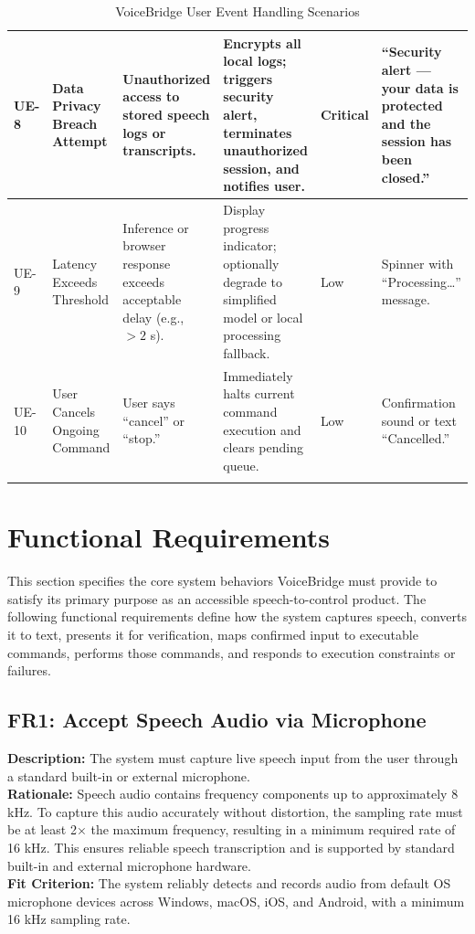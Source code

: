 \documentclass[11pt]{article}
\begin{document}
\begin{table}[H]
\begin{tabularx}{\textwidth}{p{1cm} p{2cm} X X p{1cm} p{2cm}}
\hline
UE-8 & Data Privacy Breach Attempt & Unauthorized access to stored speech logs or transcripts. & Encrypts all local logs; triggers security alert, terminates unauthorized session, and notifies user. & Critical & “Security alert — your data is protected and the session has been closed.” \\
\hline
UE-9 & Latency Exceeds Threshold & Inference or browser response exceeds acceptable delay (e.g., $> 2$ s). & Display progress indicator; optionally degrade to simplified model or local processing fallback. & Low & Spinner with “Processing…” message. \\
\hline
UE-10 & User Cancels Ongoing Command & User says “cancel” or “stop.” & Immediately halts current command execution and clears pending queue. & Low & Confirmation sound or text “Cancelled.” \\
\bottomrule
\caption{VoiceBridge User Event Handling Scenarios}
\label{tab:undesired-events}
\end{tabularx}
\end{table}



\section{Functional Requirements}\label{sec:FR}
This section specifies the core system behaviors VoiceBridge must provide to satisfy its primary purpose as an accessible speech-to-control product. The following functional requirements define how the system captures speech, converts it to text, presents it for verification, maps confirmed input to executable commands, performs those commands, and responds to execution constraints or failures.

\subsection{FR1: Accept Speech Audio via Microphone}\label{fr:FR1}
\textbf{Description:} The system must capture live speech input from the user through a standard built-in or external microphone.\\
\textbf{Rationale:} Speech audio contains frequency components up to approximately 8 kHz. To capture this audio accurately without distortion, the sampling rate must be at least 2× the maximum frequency, resulting in a minimum required rate of 16 kHz. This ensures reliable speech transcription and is supported by standard built-in and external microphone hardware.\\
\textbf{Fit Criterion:} The system reliably detects and records audio from default OS microphone devices across Windows, macOS, iOS, and Android, with a minimum 16 kHz sampling rate.
\end{document}
